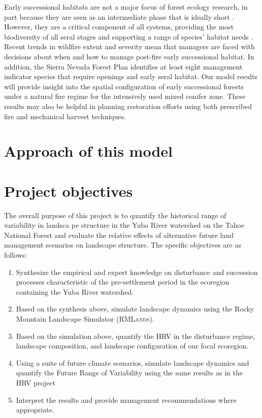 Early successional habitats are not a major focus of forest ecology research, in part because they are seen as an intermediate phase that is ideally short \citep{Swanson2011}. However, they are a critical component of all systems, providing the most biodiversity of all seral stages and supporting a range of species' habitat needs \citep{Chang1995,Hutto2008,Swanson2011}. Recent trends in wildfire extent and severity mean that managers are faced with decisions about when and how to manage post-fire early successional habitat. In addition, the Sierra Nevada Forest Plan identifies at least eight management indicator species that require openings and early seral habitat. Our model results will provide insight into the spatial configuration of early successional forests under a natural fire regime for the intensively used mixed conifer zone. These results may also be helpful in planning restoration efforts using both prescribed fire and mechanical harvest techniques.


\section{Approach of this model}


\section{Project objectives}

The overall purpose of this project is to quantify the historical range of variability in landsca pe structure in the Yuba River watershed on the Tahoe National Forest and evaluate the relative effects of  alternative future land management scenarios on landscape structure. The specific objectives are as follows:
\begin{enumerate}
	\item Synthesize the empirical and expert knowledge on disturbance and succession processes characteristic of the pre-settlement period in the ecoregion containing the Yuba River watershed.
	\item Based on the synthesis above, simulate landscape dynamics using the Rocky Mountain Landscape Simulator (\textsc{RMLands}).
	\item Based on the simulation above, quantify the HRV in the disturbance regime, landscape composition, and landscape configuration of our focal ecoregion.
	\item Using a suite of future climate scenarios, simulate landscape dynamics and quantify the Future Range of Variability using the same results as in the HRV project
	\item Interpret the results and provide management recommendations where appropriate.
\end{enumerate}





